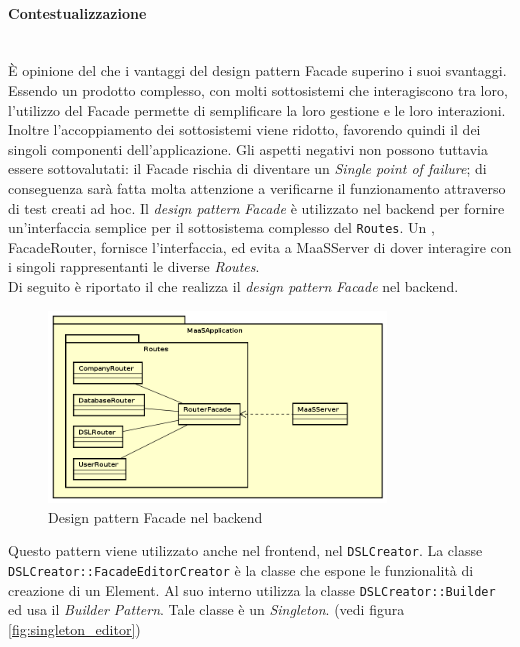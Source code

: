 \paragraph{Contestualizzazione}\mbox{} \\
È opinione del  che i vantaggi del design pattern Facade superino i suoi svantaggi. Essendo  un prodotto complesso, con molti sottosistemi che interagiscono tra loro, l'utilizzo del Facade permette di semplificare la loro gestione e le loro interazioni. Inoltre l'accoppiamento dei sottosistemi viene ridotto, favorendo quindi il  dei singoli componenti dell'applicazione. Gli aspetti negativi non possono tuttavia essere sottovalutati: il Facade rischia di diventare un \textit{Single point of failure}; di conseguenza sarà fatta molta attenzione a verificarne il funzionamento attraverso  di test creati ad hoc.
Il \textit{design pattern} \textit{Facade} è utilizzato nel backend per fornire un'interfaccia semplice per il sottosistema complesso del  \texttt{Routes}. Un , FacadeRouter, fornisce l'interfaccia, ed evita a MaaSServer di dover interagire con i singoli  rappresentanti le diverse \textit{Routes}. \\
Di seguito è riportato il  che realizza il \textit{design pattern} \textit{Facade} nel backend.
\begin{figure}[H]
\centering
\includegraphics[width=0.8\textwidth]{res/sections/backend/facadeRoutes.png}
\caption{Design pattern Facade nel backend}
\end{figure}
Questo pattern viene utilizzato anche nel frontend, nel  \texttt{DSLCreator}. La classe \texttt{DSLCreator::FacadeEditorCreator} è la classe che espone le funzionalità di creazione di un  Element. Al suo interno utilizza la classe \texttt{DSLCreator::Builder} ed usa il \textit{Builder Pattern}. Tale classe è un \textit{Singleton}. (vedi figura \ref{fig:singleton_editor})
